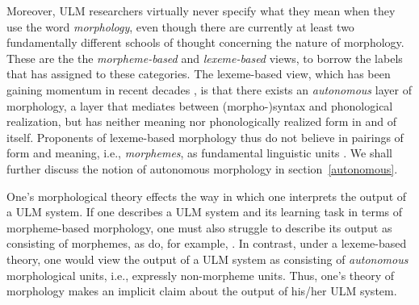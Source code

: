 Moreover, \ac{ULM} researchers virtually never specify what they mean
when they use the word \emph{morphology}, even though there
are currently at least two fundamentally different schools of thought concerning the nature of morphology. These are the 
the \emph{morpheme-based} and \emph{lexeme-based} views, to borrow the labels that \cite{aronoff:1994} has assigned 
to these categories. The lexeme-based view, which has been gaining momentum in recent decades \citep{anderson:2017},
is that there exists an \emph{autonomous} layer of morphology, a layer that mediates between (morpho-)syntax
and phonological realization, but has neither meaning nor phonologically realized form in and of itself. Proponents
of lexeme-based morphology thus do not believe in pairings of form and meaning, i.e., \emph{morphemes}, as fundamental linguistic
units \cite{anderson:2015}. We shall further discuss the notion of autonomous morphology in section~\ref{autonomous}. 

One's morphological theory effects the way in which one interprets the output of a \ac{ULM}  system. 
If one describes a \ac{ULM}  system and its learning task in terms of 
morpheme-based morphology, one must also struggle to 
describe its output as consisting of morphemes, as do, for example, 
\cite{creutz-and-lagus:2007,creutz-and-lagus:2005}. In contrast, under a 
lexeme-based theory, one would view the output of a \ac{ULM}  system as 
consisting of \emph{autonomous} morphological units, i.e., 
expressly non-morpheme units. 
Thus, one's theory of morphology makes an implicit claim about the output of 
his/her \ac{ULM}  system.

